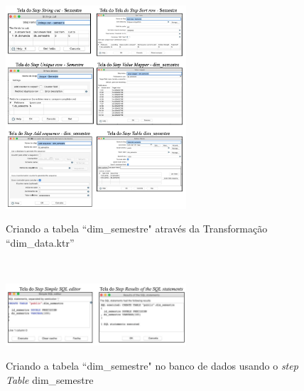 \begin{figure}[H]
	\vspace*{0,2cm}
    \centering
    \caption{Criando a tabela ``dim\_semestre" atrav\'{e}s da Transforma\c{c}\~{a}o ``dim\_data.ktr''}
    \includegraphics[width=0.6\textwidth]{./04-figuras/figura-dim-semestre}
    \label{fig:ilustfigdimsemestre}
\end{figure}
\vspace*{-0,9cm}
{\raggedright {}} \\

\begin{figure}[H]
	\vspace*{0,2cm}
    \centering
    \caption{Criando a tabela ``dim\_semestre" no banco de dados usando o \textit{step Table} dim\_semestre}
    \includegraphics[width=0.6\textwidth]{./04-figuras/figura-tb-dim-semestre}
    \label{fig:ilustfigtbdimsemestre}
\end{figure}
\vspace*{-0,9cm}
{\raggedright {}} \\

